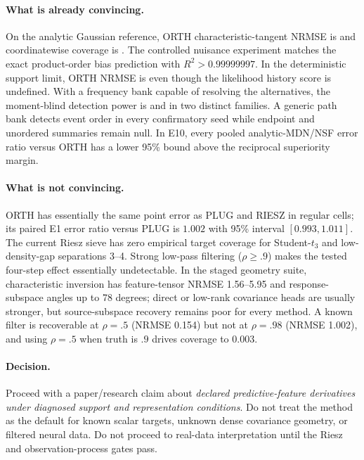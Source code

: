 \documentclass[11pt]{article}
\begin{document}
\paragraph{What is already convincing.}
On the analytic Gaussian reference, ORTH characteristic-tangent NRMSE is \EOneOrthNrmse{} and coordinatewise coverage is \EOneOrthCoverage{}.  The controlled nuisance experiment matches the exact product-order bias prediction with $R^2>0.99999997$.  In the deterministic support limit, ORTH NRMSE is \EFiveZeroNrmse{} even though the likelihood history score is undefined.  With a frequency bank capable of resolving the alternatives, the moment-blind detection power is \EFourDiscretePower{} and \EFourContinuousPower{} in two distinct families.  A generic path bank detects event order in every confirmatory seed while endpoint and unordered summaries remain null.  In E10, every pooled analytic-MDN/NSF error ratio versus ORTH has a lower 95\% bound above the reciprocal superiority margin.

\paragraph{What is not convincing.}
ORTH has essentially the same point error as PLUG and RIESZ in regular cells; its paired E1 error ratio versus PLUG is $1.002$ with 95\% interval $[0.993,1.011]$.  The current Riesz sieve has zero empirical target coverage for Student-$t_3$ and low-density-gap separations 3--4.  Strong low-pass filtering ($\rho\ge .9$) makes the tested four-step effect essentially undetectable.  In the staged geometry suite, characteristic inversion has feature-tensor NRMSE 1.56--5.95 and response-subspace angles up to 78 degrees; direct or low-rank covariance heads are usually stronger, but source-subspace recovery remains poor for every method.  A known filter is recoverable at $\rho=.5$ (NRMSE 0.154) but not at $\rho=.98$ (NRMSE 1.002), and using $\rho=.5$ when truth is $.9$ drives coverage to 0.003.

\paragraph{Decision.}
Proceed with a paper/research claim about \emph{declared predictive-feature derivatives under diagnosed support and representation conditions}.  Do not treat the method as the default for known scalar targets, unknown dense covariance geometry, or filtered neural data.  Do not proceed to real-data interpretation until the Riesz and observation-process gates pass.
\end{document}
